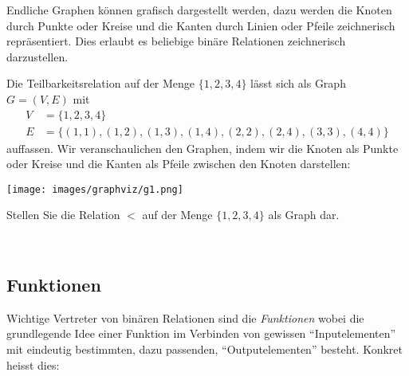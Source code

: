 Endliche Graphen können grafisch dargestellt werden, dazu werden die Knoten durch Punkte oder Kreise und die Kanten durch Linien oder Pfeile zeichnerisch repräsentiert. Dies erlaubt es beliebige binäre Relationen zeichnerisch darzustellen.

\begin{bsp}
    Die Teilbarkeitsrelation auf der Menge $\{1,2,3,4\}$ lässt sich als Graph
    $G=(V,E)$ mit
    \begin{align*}
    V &= \{1,2,3,4\}\\
    E &= \{(1,1),(1,2),(1,3),(1,4),(2,2),(2,4),(3,3),(4,4)\}
    \end{align*}
    auffassen. Wir veranschaulichen den Graphen, indem wir die Knoten als Punkte oder Kreise
    und die Kanten als Pfeile zwischen den Knoten darstellen:

    \begin{center}
            \texttt{[image: images/graphviz/g1.png]}
    \end{center}


\end{bsp}

\begin{ueb}
    Stellen Sie die Relation $<$ auf der Menge $\{1,2,3,4\}$ als Graph dar.
\end{ueb}
\begin{lsg}~
    {~\answerspace{5cm}}
\end{lsg}

\subsection{Funktionen}

Wichtige Vertreter von binären Relationen sind die \textit{Funktionen} wobei die grundlegende Idee einer Funktion im Verbinden von gewissen ``Inputelementen'' mit eindeutig bestimmten, dazu passenden, ``Outputelementen'' besteht. Konkret heisst dies:


